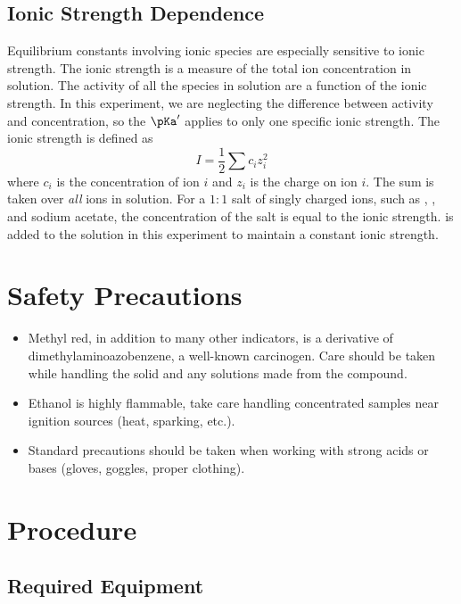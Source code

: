 \subsection{Ionic Strength Dependence}
\label{subs:ionic_strength_dependence}

Equilibrium constants involving ionic species are especially sensitive to ionic strength. 
The ionic strength is a measure of the total ion concentration in solution. 
The activity of all the species in solution are a function of the ionic strength. 
In this experiment, we are neglecting the difference between activity and concentration, so the \(\pKa'\) applies to only one specific ionic strength. 
The ionic strength is defined as
\begin{equation}
	I = \frac{1}{2} \sum c_i z_i^2
	\label{eq:ionic_strength}
\end{equation}
where \(c_i\) is the concentration of ion \(i\) and \(z_i\) is the charge on ion \(i\). 
The sum is taken over \emph{all} ions in solution. 
For a \({1{:}1}\) salt of singly charged ions, such as , , and sodium acetate, the concentration of the salt is equal to the ionic strength. 
 is added to the solution in this experiment to maintain a constant ionic strength. 

\section{Safety Precautions}
\label{sec:safety}

\begin{itemize}
	\item Methyl red, in addition to many other indicators, is a derivative of dimethylaminoazobenzene, a well-known carcinogen. Care should be taken while handling the solid and any solutions made from the compound. 
	\item Ethanol  is highly flammable, take care handling concentrated samples near ignition sources (heat, sparking, etc.).
	\item Standard precautions should be taken when working with strong acids or bases (gloves, goggles, proper clothing).
\end{itemize}

\section{Procedure}
\label{sec:procedure}

\subsection{Required Equipment}
\label{subs:required_equipment}

